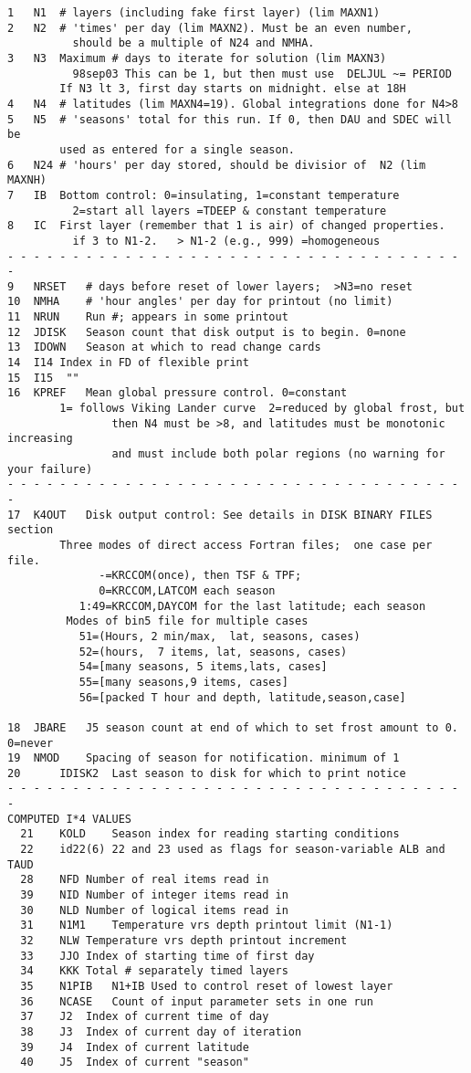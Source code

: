 \begin{verbatim}
1	N1	# layers (including fake first layer) (lim MAXN1)
2	N2	# 'times' per day (lim MAXN2). Must be an even number, 
		  should be a multiple of N24 and NMHA.
3	N3	Maximum # days to iterate for solution (lim MAXN3)
		  98sep03 This can be 1, but then must use  DELJUL ~= PERIOD
		If N3 lt 3, first day starts on midnight. else at 18H 
4	N4	# latitudes (lim MAXN4=19). Global integrations done for N4>8
5	N5	# 'seasons' total for this run. If 0, then DAU and SDEC will be 
		used as entered for a single season.
6	N24	# 'hours' per day stored, should be divisior of  N2 (lim MAXNH)
7	IB	Bottom control: 0=insulating, 1=constant temperature 
		  2=start all layers =TDEEP & constant temperature 
8	IC	First layer (remember that 1 is air) of changed properties. 
		  if 3 to N1-2.   > N1-2 (e.g., 999) =homogeneous
- - - - - - - - - - - - - - - - - - - - - - - - - - - - - - - - - - - - 
9	NRSET	# days before reset of lower layers;  >N3=no reset
10	NMHA	# 'hour angles' per day for printout (no limit)
11	NRUN	Run #; appears in some printout
12	JDISK	Season count that disk output is to begin. 0=none
13	IDOWN	Season at which to read change cards
14	I14	Index in FD of flexible print
15	I15	 ""
16	KPREF	Mean global pressure control. 0=constant
		1= follows Viking Lander curve  2=reduced by global frost, but
                then N4 must be >8, and latitudes must be monotonic increasing
                and must include both polar regions (no warning for your failure)
- - - - - - - - - - - - - - - - - - - - - - - - - - - - - - - - - - - - 
17	K4OUT	Disk output control: See details in DISK BINARY FILES section
		Three modes of direct access Fortran files;  one case per file.
		      -=KRCCOM(once), then TSF & TPF;
		      0=KRCCOM,LATCOM each season
		   1:49=KRCCOM,DAYCOM for the last latitude; each season
		 Modes of bin5 file for multiple cases
		   51=(Hours, 2 min/max,  lat, seasons, cases)
		   52=(hours,  7 items, lat, seasons, cases)
		   54=[many seasons, 5 items,lats, cases]
		   55=[many seasons,9 items, cases]
		   56=[packed T hour and depth, latitude,season,case]

18	JBARE	J5 season count at end of which to set frost amount to 0. 0=never
19	NMOD	Spacing of season for notification. minimum of 1
20      IDISK2  Last season to disk for which to print notice
- - - - - - - - - - - - - - - - - - - - - - - - - - - - - - - - - - - - 
COMPUTED I*4 VALUES
  21	KOLD    Season index for reading starting conditions
  22    id22(6)	22 and 23 used as flags for season-variable ALB and TAUD
  28	NFD	Number of real items read in
  39	NID	Number of integer items read in
  30	NLD	Number of logical items read in
  31	N1M1	Temperature vrs depth printout limit (N1-1)
  32	NLW	Temperature vrs depth printout increment
  33	JJO	Index of starting time of first day
  34	KKK	Total # separately timed layers
  35	N1PIB	N1+IB Used to control reset of lowest layer
  36	NCASE	Count of input parameter sets in one run
  37	J2	Index of current time of day
  38	J3	Index of current day of iteration
  39	J4	Index of current latitude
  40	J5	Index of current "season"


\end{verbatim}
